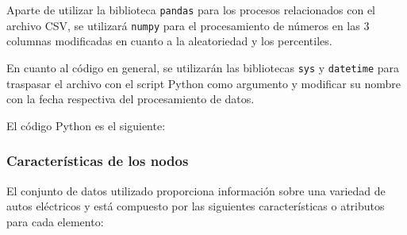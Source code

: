 \documentclass[12pt]{article}
\begin{document}
Aparte de utilizar la biblioteca \texttt{pandas} para los procesos relacionados con el archivo CSV, se utilizará \texttt{numpy} para el procesamiento de números en las 3 columnas modificadas en cuanto a la aleatoriedad y los percentiles.

En cuanto al código en general, se utilizarán las bibliotecas \texttt{sys} y \texttt{datetime} para traspasar el archivo con el script Python como argumento y modificar su nombre con la fecha respectiva del procesamiento de datos.

El código Python es el siguiente:




\subsubsection{Características de los nodos}

El conjunto de datos utilizado proporciona información sobre una variedad de autos eléctricos y está compuesto por las siguientes características o atributos para cada elemento:
\end{document}
